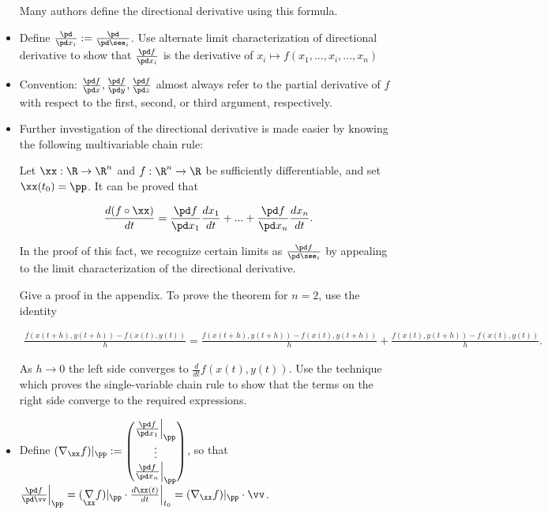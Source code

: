 \begin{itemize}
        Many authors define the directional derivative using this formula.

    \item Define $\frac{\pd}{\pd x_i} := \frac{\pd}{\pd \see_i}$. Use alternate limit characterization of directional derivative to show that $\frac{\pd f}{\pd x_i}$ is the derivative of $x_i \mapsto f(x_1, ..., x_i, ..., x_n)$
    
    \item Convention: $\frac{\pd f}{\pd x}, \frac{\pd f}{\pd y}, \frac{\pd f}{\pd z}$ almost always refer to the partial derivative of $f$ with respect to the first, second, or third argument, respectively.
    
    \item Further investigation of the directional derivative is made easier by knowing the following multivariable chain rule:
    
    Let $\xx:\R \rightarrow \R^n$ and $f:\R^n \rightarrow \R$ be sufficiently differentiable, and set $\xx(t_0) = \pp$. It can be proved that %

    \begin{align*}
        \frac{d (f \circ \xx)}{dt} = \frac{\pd f}{\pd x_1} \frac{dx_1}{dt} + ... + \frac{\pd f}{\pd x_n} \frac{dx_n}{dt}.
    \end{align*}
    
    In the proof of this fact, we recognize certain limits as $\frac{\pd f}{\pd \see_i}$ by appealing to the limit characterization of the directional derivative.
    
    Give a proof in the appendix. To prove the theorem for $n = 2$, use the identity
    
    \begin{align*}
        \frac{f(x(t + h), y(t + h)) - f(x(t), y(t))}{h} = \frac{f(x(t + h), y(t + h)) - f(x(t), y(t + h))}{h} + \frac{f(x(t), y(t + h)) - f(x(t), y(t))}{h}.
    \end{align*}
    
    As $h \rightarrow 0$ the left side converges to $\frac{d}{dt}f(x(t), y(t))$. Use the technique which proves the single-variable chain rule to show that the terms on the right side converge to the required expressions.
    
    \item Define $(\nabla_\xx f)|_\pp := \begin{pmatrix} \frac{\pd f}{\pd x_1}\Big|_\pp \\ \vdots \\ \frac{\pd f}{\pd x_n}\Big|_\pp \end{pmatrix}$, so that $\frac{\pd f}{\pd \vv} \Big|_\pp = (\underset{\xx}{\nabla} f)|_\pp \cdot \frac{d\xx(t)}{dt}\Big|_{t_0}= (\nabla_\xx f)|_\pp \cdot \vv$.
    

\end{itemize}
